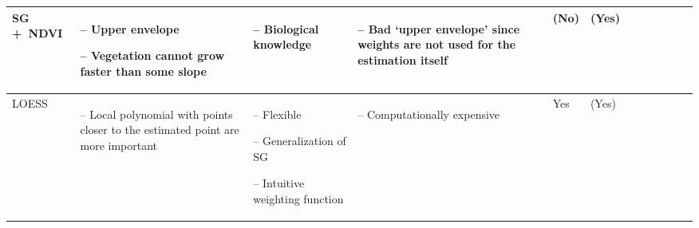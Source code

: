 \begin{table}[!ht]
\begin{tabular}{p{1.6cm}p{3.3cm}p{3.3cm}p{3.4cm}p{0.4cm}p{0.4cm}p{3cm}p{3cm}p{3cm}p{3cm}p{2.7cm}p{3cm}|}
		SG +~NDVI                                                                                                                                                    &
		\begin{cptitemize} \item[--]  Upper envelope \item[--]  Vegetation cannot grow faster than some slope                                \end{cptitemize}        &
		\begin{cptitemize} \item[--]  Biological knowledge                                                                            \end{cptitemize}               &
		\begin{cptitemize} \item[--]  Bad `upper envelope' since weights are not used for the estimation itself                    \end{cptitemize}               &
		(No)                                                                                                                                                         &
		(Yes)                                                                                                                                                         \\ \hline%

		LOESS                                                                                                                                                        &
		\begin{cptitemize} \item[--]  Local  polynomial with points closer to the estimated point are more important                  \end{cptitemize}               &
		\begin{cptitemize} \item[--]  Flexible \item[--]  Generalization of SG \item[--] Intuitive weighting function                   \end{cptitemize} &
		\begin{cptitemize} \item[--]  Computationally expensive                                                                       \end{cptitemize}               &
		Yes                                                                                                                                                          &
		(Yes)                                                                                                                                                         \\ \hline%


\end{tabular}
\end{table}
